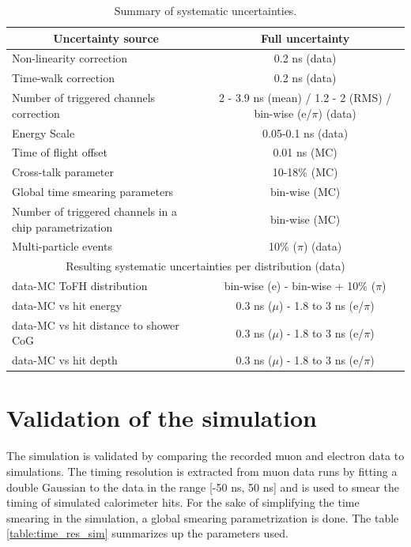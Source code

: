 \begin{table}[htb!]
	\centering
	\caption{Summary of systematic uncertainties.}
	\label{table:time_syst}
	\begin{tabular}{@{} lc @{}}
		\toprule
		\multicolumn{1}{c}{Uncertainty source} & Full uncertainty \\
		\midrule
		Non-linearity correction & 0.2 ns (data)\\
		Time-walk correction & 0.2 ns (data)\\
		Number of triggered channels correction & 2 - 3.9 ns (mean) / 1.2 - 2 (RMS) / bin-wise (e/$\pi$) (data)\\
		Energy Scale & 0.05-0.1 ns (data)\\
		Time of flight offset & 0.01 ns (MC) \\
		Cross-talk parameter & 10-18\% (MC)\\
		Global time smearing parameters & bin-wise (MC)\\
		Number of triggered channels in a chip parametrization & bin-wise (MC)\\
		Multi-particle events & 10\% ($\pi$) (data)\\
		\midrule
		\midrule
		\multicolumn{2}{c}{Resulting systematic uncertainties per distribution (data)} \\
		\midrule
		data-MC ToFH distribution & bin-wise (e) - bin-wise + 10\% ($\pi$) \\
		data-MC vs hit energy & 0.3 ns ($\mu$) - 1.8 to 3 ns (e/$\pi$)\\
		data-MC vs hit distance to shower CoG & 0.3 ns ($\mu$) - 1.8 to 3 ns (e/$\pi$)\\
		data-MC vs hit depth & 0.3 ns ($\mu$) - 1.8 to 3 ns (e/$\pi$)\\
		\bottomrule
	\end{tabular}
\end{table}

\section{Validation of the simulation}

The simulation is validated by comparing the recorded muon and electron data to simulations. The timing resolution is extracted from muon data runs by fitting a double Gaussian to the data in the range [-50 ns, 50 ns] and is used to smear the timing of simulated calorimeter hits. For the sake of simplifying the time smearing in the simulation, a global smearing parametrization is done. The table \ref{table:time_res_sim} summarizes up the parameters used.

